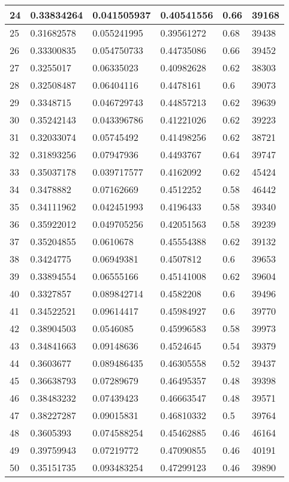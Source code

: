 \begin{longtable}{|l|l|l|l|l|l|}
24 & 0.33834264 & 0.041505937 & 0.40541556 & 0.66 & 39168 \\ \hline 
25 & 0.31682578 & 0.055241995 & 0.39561272 & 0.68 & 39438 \\ \hline 
26 & 0.33300835 & 0.054750733 & 0.44735086 & 0.66 & 39452 \\ \hline 
27 & 0.3255017 & 0.06335023 & 0.40982628 & 0.62 & 38303 \\ \hline 
28 & 0.32508487 & 0.06404116 & 0.4478161 & 0.6 & 39073 \\ \hline 
29 & 0.3348715 & 0.046729743 & 0.44857213 & 0.62 & 39639 \\ \hline 
30 & 0.35242143 & 0.043396786 & 0.41221026 & 0.62 & 39223 \\ \hline 
31 & 0.32033074 & 0.05745492 & 0.41498256 & 0.62 & 38721 \\ \hline 
32 & 0.31893256 & 0.07947936 & 0.4493767 & 0.64 & 39747 \\ \hline 
33 & 0.35037178 & 0.039717577 & 0.4162092 & 0.62 & 45424 \\ \hline 
34 & 0.3478882 & 0.07162669 & 0.4512252 & 0.58 & 46442 \\ \hline 
35 & 0.34111962 & 0.042451993 & 0.4196433 & 0.58 & 39340 \\ \hline 
36 & 0.35922012 & 0.049705256 & 0.42051563 & 0.58 & 39239 \\ \hline 
37 & 0.35204855 & 0.0610678 & 0.45554388 & 0.62 & 39132 \\ \hline 
38 & 0.3424775 & 0.06949381 & 0.4507812 & 0.6 & 39653 \\ \hline 
39 & 0.33894554 & 0.06555166 & 0.45141008 & 0.62 & 39604 \\ \hline 
40 & 0.3327857 & 0.089842714 & 0.4582208 & 0.6 & 39496 \\ \hline 
41 & 0.34522521 & 0.09614417 & 0.45984927 & 0.6 & 39770 \\ \hline 
42 & 0.38904503 & 0.0546085 & 0.45996583 & 0.58 & 39973 \\ \hline 
43 & 0.34841663 & 0.09148636 & 0.4524645 & 0.54 & 39379 \\ \hline 
44 & 0.3603677 & 0.089486435 & 0.46305558 & 0.52 & 39437 \\ \hline 
45 & 0.36638793 & 0.07289679 & 0.46495357 & 0.48 & 39398 \\ \hline 
46 & 0.38483232 & 0.07439423 & 0.46663547 & 0.48 & 39571 \\ \hline 
47 & 0.38227287 & 0.09015831 & 0.46810332 & 0.5 & 39764 \\ \hline 
48 & 0.3605393 & 0.074588254 & 0.45462885 & 0.46 & 46164 \\ \hline 
49 & 0.39759943 & 0.07219772 & 0.47090855 & 0.46 & 40191 \\ \hline 
50 & 0.35151735 & 0.093483254 & 0.47299123 & 0.46 & 39890 \\ \hline 
\end{longtable}